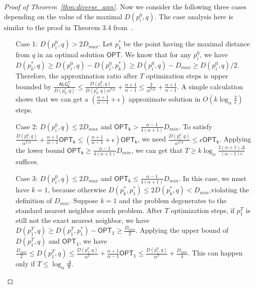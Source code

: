 \begin{proof}[Proof of Theorem~\ref{thm:diverse_ann}]

Now we consider the following three cases depending on the value of the maximal $D(p^0_i,q)$. The case analysis here is similar to the proof in Theorem 3.4 from~\cite{indykxu2024worst}.
\begin{enumerate}
\item[Case 1:] $D(p^0_i,q)>2D_{max}$. Let $p^*_k$ be the point having the maximal distance from $q$ in an optimal solution $\mathsf{OPT}$. We know that for any $p^0_i$, we have $D(p^*_k,q)\ge D(p^0_i,q)-D(p^0_i,p^*_k)\ge D(p^0_i,q)-D_{max}\ge D(p^0_i,q)/2$. Therefore, the approximation ratio after $T$ optimization steps is upper bounded by $\frac{\mathsf{ALG^T_k}}{D(p^*_k,q)}\le \frac{D(p^0_i,q)}{D(p^*_k,q)\alpha^{T/k}}+\frac{\alpha+1}{\alpha-1}\le \frac{2}{\alpha^{T/k}}+\frac{\alpha+1}{\alpha-1}$. A simple calculation shows that we can get a $(\frac{\alpha+1}{\alpha-1}+\epsilon)$ approximate solution in $O(k\log_{\alpha}\frac{2}{\epsilon})$ steps.

\item[Case 2:] $D(p^0_i,q)\le 2D_{max}$ and $\mathsf{OPT_k}>\frac{\alpha-1}{4(\alpha+1)}D_{min}$. To satisfy $\frac{D(p^0_i,q)}{\alpha^{T/k}}+\frac{\alpha+1}{\alpha-1}\mathsf{OPT_k}\le (\frac{\alpha+1}{\alpha-1}+\epsilon)\mathsf{OPT_k}$, we need $\frac{D(p^0_i,q)}{\alpha^{T/k}}\le \epsilon \mathsf{OPT_k}$. Applying the lower bound $\mathsf{OPT_k}\ge \frac{\alpha-1}{4(\alpha+1)}D_{min}$, we can get that $T\ge k\log_{\alpha}\frac{2(\alpha+1)\Delta}{(\alpha-1)\epsilon}$ suffices.

\item[Case 3:] $D(p^0_i,q)\le 2D_{max}$ and $\mathsf{OPT_k}\le \frac{\alpha-1}{4(\alpha+1)}D_{min}$. In this case, we must have $k=1$, because otherwise $D(p^*_k,p^*_1)\le 2D(p^*_k,q)<D_{min}$,violating the definition of $D_{min}$. Suppose $k=1$ and the problem degenerates to the standard nearest neighbor search problem. After $T$ optimization steps, if $p^T_1$ is still not the exact nearest neighbor, we have $D(p^T_1,q)\ge D(p^T_1,p^*_1)-\mathsf{OPT_1}\ge \frac{D_{min}}{2}$. Applying the upper bound of $D(p^T_1,q)$ and $\mathsf{OPT_1}$, we have $\frac{D_{min}}{2}\le D(p^T_1,q)\le \frac{D(p^0_1,q)}{\alpha^{T}}+\frac{\alpha+1}{\alpha-1}\mathsf{OPT_1}\le \frac{D(p^0_1,q)}{\alpha^{T}}+\frac{D_{min}}{4}$. This can happen only if $T\le \log_{\alpha}\frac{\Delta}{8}$.
\end{enumerate}
\end{proof}


